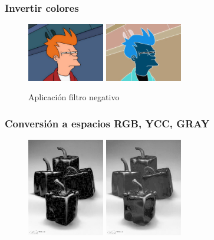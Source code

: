 \subsubsection{Invertir colores}
\vskip0.3cm
\begin{figure}[H]
 \centering
  \includegraphics[width=0.3\textwidth]{imagenes/Fry.jpg}
  \includegraphics[width=0.3\textwidth]{imagenes/fryNegativo.jpg}
 \caption{Aplicación filtro negativo}
 \label{diseño}
\end{figure}
\subsubsection{Conversión a espacios RGB, YCC, GRAY}
\vskip0.3cm
\begin{figure}[H]
 \centering
  \includegraphics[width=0.3\textwidth]{imagenes/banda3RGB.jpg}
  \includegraphics[width=0.3\textwidth]{imagenes/banda3YCC.jpg}
 \caption{}
 \label{diseño}
\end{figure}
